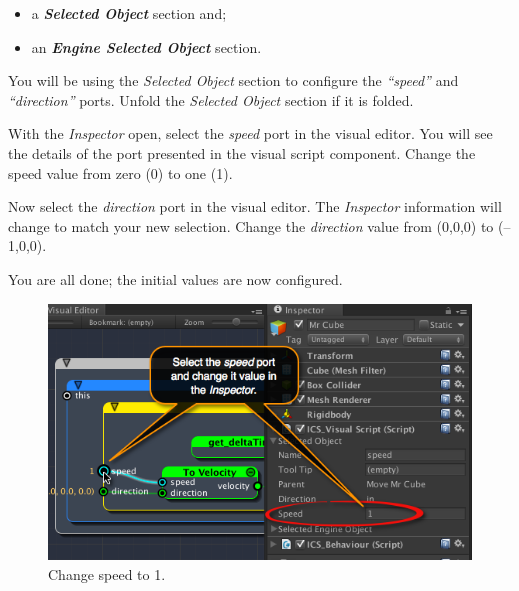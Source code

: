 \begin{itemize}
\item a \emph{\textbf{Selected Object}} section and;

\item an \emph{\textbf{Engine Selected Object}} section.

\end{itemize}

You will be using the \emph{Selected Object} section to configure the \emph{``speed''} and \emph{``direction''} ports. Unfold the \emph{Selected Object} section if it is folded.

With the \emph{Inspector} open, select the \emph{speed} port in the visual editor. You will see the details of the port presented in the visual script component. Change the speed value from zero (0) to one (1).

Now select the \emph{direction} port in the visual editor. The \emph{Inspector} information will change to match your new selection. Change the \emph{direction} value from (0,0,0) to (--1,0,0).

You are all done; the initial values are now configured.

\begin{figure}[htbp]
\centering
\includegraphics[keepaspectratio,width=\textwidth,height=0.75\textheight]{change-speed-value.png}
\caption{Change speed to 1.}
\label{change-speed-value.png}
\end{figure}

